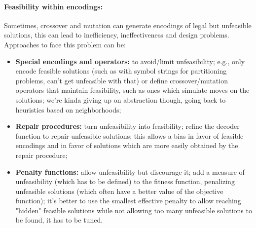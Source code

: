 \documentclass{article}
\begin{document}
	\paragraph{Feasibility within encodings:} Sometimes, crossover and mutation can generate encodings of legal but unfeasible solutions, this can lead to inefficiency, ineffectiveness and design problems. Approaches to face this problem can be: 
	\begin{itemize}
		\item \textbf{Special encodings and operators:} to avoid/limit unfeasibility; e.g., only encode feasible solutions (such as with symbol strings for partitioning problems, can't get unfeasible with that) or define crossover/mutation operators that maintain feasibility, such as ones which simulate moves on the solutions; we're kinda giving up on abstraction though, going back to heuristics based on neighborhoods;
		\item \textbf{Repair procedures:} turn unfeasibility into feasibility; refine the decoder function to repair unfeasible solutions; this allows a bias in favor of feasible encodings and in favor of solutions which are more easily obtained by the repair procedure;
		\item \textbf{Penalty functions:} allow unfeasibility but discourage it; add a measure of unfeasibility (which has to be defined) to the fitness function, penalizing unfeasible solutions (which often have a better value of the objective function); it's better to use the smallest effective penalty to allow reaching "hidden" feasible solutions while not allowing too many unfeasible solutions to be found, it has to be tuned.\\
	\end{itemize}
	
\end{document}
